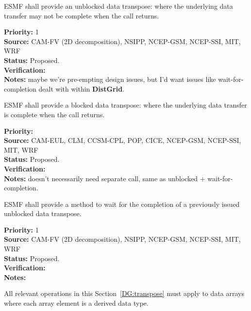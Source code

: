 \label{DG:transpose}


ESMF shall provide an unblocked data transpose: where the underlying
data transfer may not be complete when the call returns.

\begin{reqlist}
{\bf Priority:} 1 \\ 
{\bf Source:} CAM-FV (2D decomposition), NSIPP, NCEP-GSM, NCEP-SSI, MIT, WRF \\
{\bf Status:} Proposed. \\
{\bf Verification:} \\
{\bf Notes:} maybe we're pre-empting design issues, but I'd want
  issues like wait-for-completion dealt with within \textbf{DistGrid}.
\end{reqlist}


ESMF shall provide a blocked data transpose: where the underlying
data transfer is complete when the call returns.

\begin{reqlist}
{\bf Priority:} \\
{\bf Source:} CAM-EUL, CLM, CCSM-CPL, POP, CICE, NCEP-GSM, NCEP-SSI, MIT, WRF \\
{\bf Status:} Proposed. \\
{\bf Verification:} \\
{\bf Notes:} doesn't necessarily need separate call, same as unblocked
  + wait-for-completion.
\end{reqlist}


ESMF shall provide a method to wait for the completion of a previously
issued unblocked data transpose.

\begin{reqlist}
{\bf Priority:} 1 \\ 
{\bf Source:} CAM-FV (2D decomposition), NSIPP, NCEP-GSM, NCEP-SSI, MIT, WRF \\
{\bf Status:} Proposed. \\
{\bf Verification:} \\
{\bf Notes:}
\end{reqlist}


All relevant operations in this Section~\ref{DG:transpose} must apply to
data arrays where each array element is a derived data type.

